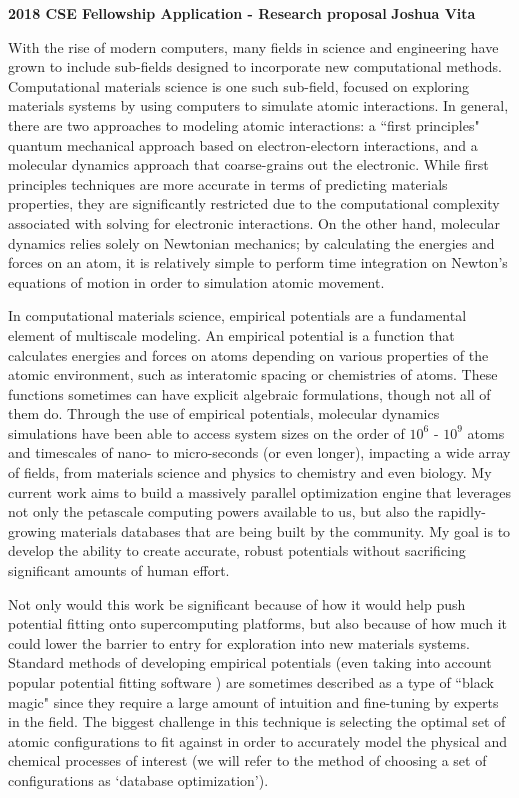 \documentclass{article}
\begin{document}
\begin{center}
    \textbf{2018 CSE Fellowship Application - Research proposal}
\hfill
\textbf{Joshua Vita}
\end{center}
\noindent\hrulefill

\bigskip

With the rise of modern computers, many fields in science and engineering have grown to include sub-fields designed to incorporate new computational methods. Computational materials science is one such sub-field, focused on exploring materials systems by using computers to simulate atomic interactions. In general, there are two approaches to modeling atomic interactions: a ``first principles" quantum mechanical approach based on electron-electorn interactions, and a molecular dynamics approach that coarse-grains out the electronic. While first principles techniques are more accurate in terms of predicting materials properties, they are significantly restricted due to the computational complexity associated with solving for electronic interactions. On the other hand, molecular dynamics relies solely on Newtonian mechanics; by calculating the energies and forces on an atom, it is relatively simple to perform time integration on Newton's equations of motion in order to simulation atomic movement.

In computational materials science, empirical potentials are a fundamental element of multiscale modeling. An empirical potential is a function that calculates energies and forces on atoms depending on various properties of the atomic environment, such as interatomic spacing or chemistries of atoms. These functions sometimes can have explicit algebraic formulations, though not all of them do. Through the use of empirical potentials, molecular dynamics simulations have been able to access system sizes on the order of $10^6$ - $10^9$ atoms and timescales of nano- to micro-seconds (or even longer), impacting a wide array of fields, from materials science and physics to chemistry and even biology. My current work aims to build a massively parallel optimization engine that leverages not only the petascale computing powers available to us, but also the rapidly-growing materials databases that are being built by the community. My goal is to develop the ability to create accurate, robust potentials without sacrificing significant amounts of human effort.

\bigskip

Not only would this work be significant because of how it would help push potential fitting onto supercomputing platforms, but also because of how much it could lower the barrier to entry for exploration into new materials systems. Standard methods of developing empirical potentials (even taking into account popular potential fitting software \cite{potfit}) are sometimes described as a type of ``black magic" since they require a large amount of intuition and fine-tuning by experts in the field. The biggest challenge in this technique is selecting the optimal set of atomic configurations to fit against in order to accurately model the physical and chemical processes of interest (we will refer to the method of choosing a set of configurations as `database optimization').
\end{document}
